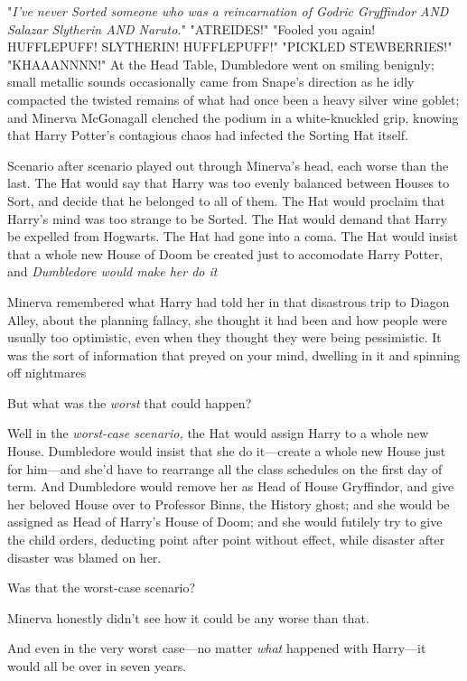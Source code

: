 "\emph{I've never Sorted someone who was a reincarnation of Godric Gryffindor
AND Salazar Slytherin AND Naruto.}"
\sbreak
"ATREIDES!"
\sbreak
"Fooled you again! HUFFLEPUFF! SLYTHERIN! HUFFLEPUFF!"
\sbreak
"PICKLED STEWBERRIES!"
\sbreak
"KHAAANNNN!"
\sbreak
At the Head Table, Dumbledore went on smiling benignly; small metallic sounds
occasionally came from Snape's direction as he idly compacted the twisted
remains of what had once been a heavy silver wine goblet; and Minerva
McGonagall clenched the podium in a white-knuckled grip, knowing that Harry
Potter's contagious chaos had infected the Sorting Hat itself.

Scenario after scenario played out through Minerva's head, each worse than the
last. The Hat would say that Harry was too evenly balanced between Houses to
Sort, and decide that he belonged to all of them. The Hat would proclaim that
Harry's mind was too strange to be Sorted. The Hat would demand that Harry be
expelled from Hogwarts. The Hat had gone into a coma. The Hat would insist that
a whole new House of Doom be created just to accomodate Harry Potter, and
\emph{Dumbledore would make her do it{\el}}

Minerva remembered what Harry had told her in that disastrous trip to Diagon
Alley, about the{\el} planning fallacy, she thought it had been{\el} and
how people were usually too optimistic, even when they thought they were being
pessimistic. It was the sort of information that preyed on your mind, dwelling
in it and spinning off nightmares{\el}

But what was the \emph{worst} that could happen?

Well{\el} in the \emph{worst-case scenario,} the Hat would assign Harry to a
whole new House. Dumbledore would insist that she do it—create a whole new
House just for him—and she'd have to rearrange all the class schedules on the
first day of term. And Dumbledore would remove her as Head of House Gryffindor,
and give her beloved House over to{\el} Professor Binns, the History ghost;
and she would be assigned as Head of Harry's House of Doom; and she would
futilely try to give the child orders, deducting point after point without
effect, while disaster after disaster was blamed on her.

Was that the worst-case scenario?

Minerva honestly didn't see how it could be any worse than that.

And even in the very worst case—no matter \emph{what} happened with
Harry—it would all be over in seven years.

